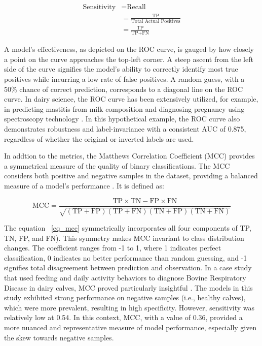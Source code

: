 \begin{equation} \label{eq_sensitivity}
    \begin{split}
    \text{Sensitivity} &= \text{Recall} \\
                        &= \frac{\text{TP}}{\text{Total Actual Positives}} \\
                        &=\frac{\text{TP}}{\text{TP} + \text{FN}}
    \end{split}
\end{equation}

A model's effectiveness, as depicted on the ROC curve, is gauged by how closely a point on the curve approaches the top-left corner. A steep ascent from the left side of the curve signifies the model's ability to correctly identify most true positives while incurring a low rate of false positives. A random guess, with a 50\% chance of correct prediction, corresponds to a diagonal line on the ROC curve. In dairy science, the ROC curve has been extensively utilized, for example, in predicting mastitis from milk composition \citep{jensen_bayesian_2016} and diagnosing pregnancy using spectroscopy technology \citep{delhez_diagnosing_2020}. In this hypothetical example, the ROC curve also demonstrates robustness and label-invariance with a consistent AUC of 0.875, regardless of whether the original or inverted labels are used.

In addtion to the metrics, the Matthews Correlation Coefficient (MCC) provides a symmetrical measure of the quality of binary classifications. The MCC considers both positive and negative samples in the dataset, providing a balanced measure of a model's performance \citep{chicco_advantages_2020}. It is defined as:

\begin{equation} \label{eq_mcc}
    \text{MCC} = \frac{\text{TP} \times \text{TN} - \text{FP} \times \text{FN}}{\sqrt{(\text{TP} + \text{FP})(\text{TP} + \text{FN})(\text{TN} + \text{FP})(\text{TN} + \text{FN})}}
\end{equation}

The equation ~\ref{eq_mcc} symmetrically incorporates all four components of TP, TN, FP, and FN). This symmetry makes MCC invariant to class distribution changes. The coefficient ranges from -1 to 1, where 1 indicates perfect classification, 0 indicates no better performance than random guessing, and -1 signifies total disagreement between prediction and observation. In a case study that used feeding and daily activity behaviors to diagnose Bovine Respiratory Disease in dairy calves, MCC proved particularly insightful \citep{bowen_early_2021}. The models in this study exhibited strong performance on negative samples (i.e., healthy calves), which were more prevalent, resulting in high specificity. However, sensitivity was relatively low at 0.54. In this context, MCC, with a value of 0.36, provided a more nuanced and representative measure of model performance, especially given the skew towards negative samples.

